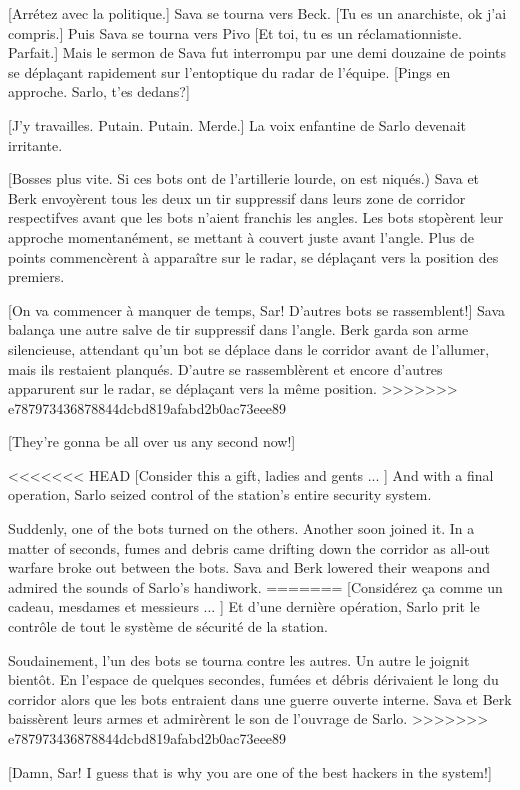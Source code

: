 [Arrétez avec la politique.] Sava se tourna vers Beck. [Tu es un anarchiste, ok j'ai compris.] Puis Sava se tourna vers Pivo [Et toi, tu  es un réclamationniste. Parfait.] Mais le sermon de Sava fut interrompu par une demi douzaine de points se déplaçant rapidement sur l'entoptique du radar de l'équipe. [Pings en approche. Sarlo, t'es dedans?] 

[J'y travailles. Putain. Putain. Merde.] La voix enfantine de Sarlo devenait irritante. 

[Bosses plus vite. Si ces bots ont de l'artillerie lourde, on est niqués.) Sava et Berk envoyèrent tous les deux un tir suppressif dans leurs zone de corridor respectifves avant que les bots n'aient franchis les angles. Les bots stopèrent leur approche momentanément, se mettant à couvert juste avant l'angle. Plus de points commencèrent à apparaître sur le radar, se déplaçant vers la position des premiers. 

[On va commencer à manquer de temps, Sar! D'autres bots se rassemblent!] Sava balança une autre salve de tir suppressif dans l'angle. Berk garda son arme silencieuse, attendant qu'un bot se déplace dans le corridor avant de l'allumer, mais ils restaient planqués. D'autre se rassemblèrent et encore d'autres apparurent sur le radar, se déplaçant vers la même position. 
>>>>>>> e787973436878844dcbd819afabd2b0ac73eee89

[They're gonna be all over us any second now!] 

<<<<<<< HEAD
[Consider this a gift, ladies and gents ... ] And with a final operation, Sarlo seized control of the station's entire security system. 

Suddenly, one of the bots turned on the others. Another soon joined it. In a matter of seconds, fumes and debris came drifting down the corridor as all-out warfare broke out between the bots. Sava and Berk lowered their weapons and admired the sounds of Sarlo's handiwork. 
=======
[Considérez ça comme un cadeau, mesdames et messieurs ... ] Et d'une dernière opération, Sarlo prit le contrôle de tout le système de sécurité de la station. 

Soudainement, l'un des bots se tourna contre les autres. Un autre le joignit bientôt. En l'espace de quelques secondes, fumées et débris dérivaient le long du corridor alors que les bots entraient dans une guerre ouverte interne. Sava et Berk baissèrent leurs armes et admirèrent le son de l'ouvrage de Sarlo. 
>>>>>>> e787973436878844dcbd819afabd2b0ac73eee89

[Damn, Sar! I guess that is why you are one of the best hackers in the system!] 

